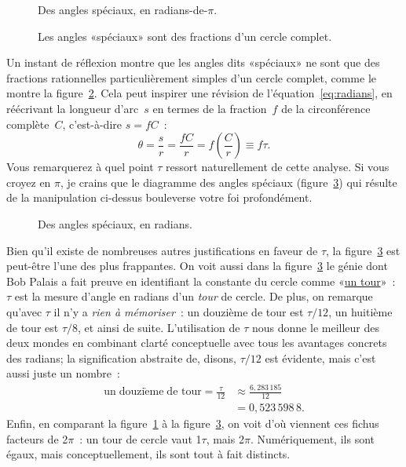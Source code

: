 \begin{figure}
\begin{center}
\end{center}
\caption{Des angles spéciaux, en radians-de-$\pi$.\label{fig:pi_angles}}
\end{figure}

\begin{figure}
\begin{center}
\end{center}
\caption{Les angles «\ns spéciaux\ns » sont des fractions d'un cercle
complet.\label{fig:angle_fractions}}
\end{figure}

Un instant de réflexion montre que les angles dits «\ns spéciaux\ns » ne sont que
des fractions rationnelles particulièrement simples d'un cercle complet, comme
le montre la figure~\ref{fig:angle_fractions}. Cela peut inspirer une révision de
l'équation~\eqref{eq:radians}, en réécrivant la longueur d'arc~$s$ en termes de
la fraction~$f$ de la circonférence complète~$C$, c'est-à-dire $s = f C$~:
\[ \theta = \frac{s}{r} = \frac{fC}{r} =  f\left(\frac{C}{r}\right) \equiv f\tau. \]
Vous remarquerez à quel point $\tau$ ressort naturellement de cette analyse. Si vous croyez en
$\pi$, je crains que le diagramme des angles spéciaux (figure~\ref{fig:tau_angles})
qui résulte de la manipulation ci-dessus bouleverse votre foi profondément.

\begin{figure}
\begin{center}
\end{center}
\caption{Des angles spéciaux, en radians.\label{fig:tau_angles}}
\end{figure}

Bien qu'il existe de nombreuses autres justifications en faveur de $\tau$, la
figure~\ref{fig:tau_angles} est peut-être l'une des plus frappantes. On voit
aussi dans la figure~\ref{fig:tau_angles} le génie dont Bob Palais
a fait preuve en identifiant la constante du cercle comme
«\ns \href{https://fr.wikipedia.org/wiki/Tour_(angle)}{un tour}\ns »~: $\tau$ est la
mesure d'angle en radians d'un \emph{tour} de cercle. De plus, on remarque
qu'avec $\tau$ il n'y a \emph{rien à mémoriser}~: un douzième de tour est
$\tau/12$, un huitième de tour est $\tau/8$, et ainsi de suite. L'utilisation de
$\tau$ nous donne le meilleur des deux mondes en combinant clarté conceptuelle
avec tous les avantages concrets des radians\ns; la signification abstraite de,
disons, $\tau/12$ est évidente, mais c'est aussi juste un nombre~:
\[
\begin{split}
\mbox{un}\; \mathrm{douzi\grave{e}me}\; \mbox{de tour} = \frac{\tau}{12} & \approx \frac{6{,}283\,185}{12} \\
                                             & = 0{,}523\,598\,8.
\end{split}
\]
Enfin, en comparant la figure~\ref{fig:pi_angles} à la
figure~\ref{fig:tau_angles}, on voit d'où viennent ces fichus facteurs de
2$\pi$~: un tour de cercle vaut 1$\tau$, mais 2$\pi$. Numériquement, ils sont
égaux, mais conceptuellement, ils sont tout à fait distincts.

